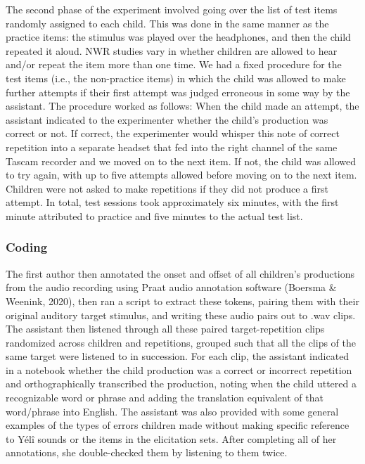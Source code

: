 \documentclass[
  english,
  ,man,floatsintext]{apa6}
\begin{document}
The second phase of the experiment involved going over the list of test items randomly assigned to each child. This was done in the same manner as the practice items: the stimulus was played over the headphones, and then the child repeated it aloud. NWR studies vary in whether children are allowed to hear and/or repeat the item more than one time. We had a fixed procedure for the test items (i.e., the non-practice items) in which the child was allowed to make further attempts if their first attempt was judged erroneous in some way by the assistant. The procedure worked as follows: When the child made an attempt, the assistant indicated to the experimenter whether the child's production was correct or not. If correct, the experimenter would whisper this note of correct repetition into a separate headset that fed into the right channel of the same Tascam recorder and we moved on to the next item. If not, the child was allowed to try again, with up to five attempts allowed before moving on to the next item. Children were not asked to make repetitions if they did not produce a first attempt. In total, test sessions took approximately six minutes, with the first minute attributed to practice and five minutes to the actual test list.

\hypertarget{coding}{%
\subsubsection{Coding}\label{coding}}

The first author then annotated the onset and offset of all children's productions from the audio recording using Praat audio annotation software (Boersma \& Weenink, 2020), then ran a script to extract these tokens, pairing them with their original auditory target stimulus, and writing these audio pairs out to .wav clips. The assistant then listened through all these paired target-repetition clips randomized across children and repetitions, grouped such that all the clips of the same target were listened to in succession. For each clip, the assistant indicated in a notebook whether the child production was a correct or incorrect repetition and orthographically transcribed the production, noting when the child uttered a recognizable word or phrase and adding the translation equivalent of that word/phrase into English. The assistant was also provided with some general examples of the types of errors children made without making specific reference to Yélî sounds or the items in the elicitation sets. After completing all of her annotations, she double-checked them by listening to them twice.
\end{document}

